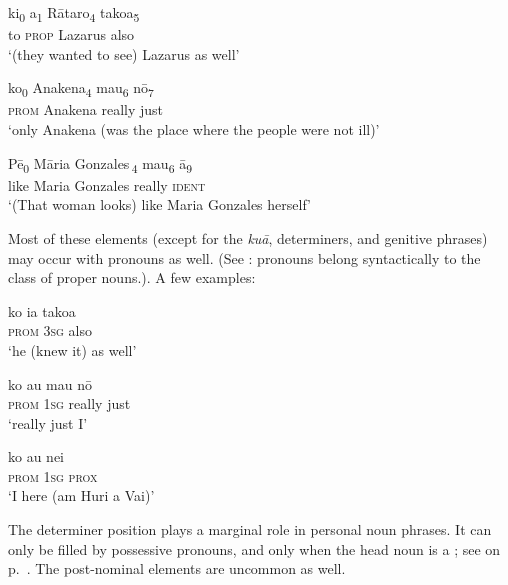 \ea\label{ex:5.180}
\gll ki\textsubscript{0} a\textsubscript{1} Rātaro\textsubscript{4} tako{\ꞌ}a\textsubscript{5} \\
to \textsc{prop} Lazarus also \\

\glt 
‘(they wanted to see) Lazarus as well’ \textstyleExampleref{[John 12:9]}
\z

\ea\label{ex:5.181}
\gll ko\textsubscript{0} {\ꞌ}Anakena\textsubscript{4} mau\textsubscript{6} nō\textsubscript{7} \\
\textsc{prom} Anakena really just \\

\glt 
‘only Anakena (was the place where the people were not ill)’ \textstyleExampleref{[R231.098]} 
\z

\ea\label{ex:5.182}
\gll Pē\textsubscript{0} {\ob}Māria Gonzales\,{\cb}\textsubscript{4} mau\textsubscript{6} {\ꞌ}ā\textsubscript{9} \\
like {\db}Maria Gonzales really \textsc{ident} \\

\glt 
‘(That woman looks) like Maria Gonzales herself’ \textstyleExampleref{[R416.360]} 
\z

Most of these elements (except for the \textit{kuā}, determiners, and genitive phrases) may occur with pronouns as well. (See : pronouns belong syntactically to the class of proper nouns.). A few examples:

\ea\label{ex:5.183}
\gll ko ia tako{\ꞌ}a \\
\textsc{prom} \textsc{3sg} also \\

\glt 
‘he (knew it) as well’ \textstyleExampleref{[R620.037]} 
\z

\ea\label{ex:5.184}
\gll ko au mau nō \\
\textsc{prom} \textsc{1sg} really just \\

\glt 
‘really just I’ \textstyleExampleref{[R404.048]} 
\z

\ea\label{ex:5.185}
\gll ko au nei\\
\textsc{prom} \textsc{1sg} \textsc{prox}\\

\glt 
‘I here (am Huri a Vai)’ \textstyleExampleref{[R304.086]} 
\z

The determiner position plays a marginal role in personal noun phrases. It can only be filled by possessive pronouns, and only when the head noun is a ; see  on p.~\pageref{ex:5.198}. The post-nominal elements are uncommon as well. 


